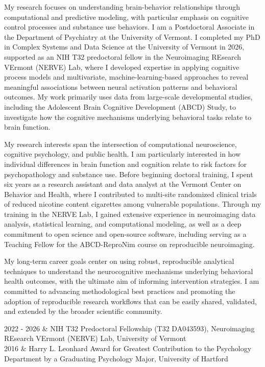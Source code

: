 \documentclass{nihbiosketch}
\begin{document}

My research focuses on understanding brain-behavior relationships through computational and predictive modeling, with particular emphasis on cognitive control processes and substance use behaviors. I am a Postdoctoral Associate in the Department of Psychiatry at the University of Vermont. I completed my PhD in Complex Systems and Data Science at the University of Vermont in 2026, supported as an NIH T32 predoctoral fellow in the Neuroimaging REsearch VErmont (NERVE) Lab, where I developed expertise in applying cognitive process models and multivariate, machine-learning-based approaches to reveal meaningful associations between neural activation patterns and behavioral outcomes. My work primarily uses data from large-scale developmental studies, including the Adolescent Brain Cognitive Development (ABCD) Study, to investigate how the cognitive mechanisms underlying behavioral tasks relate to brain function.

My research interests span the intersection of computational neuroscience, cognitive psychology, and public health. I am particularly interested in how individual differences in brain function and cognition relate to risk factors for psychopathology and substance use. Before beginning doctoral training, I spent six years as a research assistant and data analyst at the Vermont Center on Behavior and Health, where I contributed to multi-site randomized clinical trials of reduced nicotine content cigarettes among vulnerable populations. Through my training in the NERVE Lab, I gained extensive experience in neuroimaging data analysis, statistical learning, and computational modeling, as well as a deep commitment to open science and open-source software, including serving as a Teaching Fellow for the ABCD-ReproNim course on reproducible neuroimaging.

My long-term career goals center on using robust, reproducible analytical techniques to understand the neurocognitive mechanisms underlying behavioral health outcomes, with the ultimate aim of informing intervention strategies. I am committed to advancing methodological best practices and promoting the adoption of reproducible research workflows that can be easily shared, validated, and extended by the broader scientific community.

\begin{datelist}
	2022 - 2026 & NIH T32 Predoctoral Fellowship (T32 DA043593), Neuroimaging REsearch VErmont (NERVE) Lab, University of Vermont \\
	2016 & Harry L. Leonhard Award for Greatest Contribution to the Psychology Department by a Graduating Psychology Major, University of Hartford \\
\end{datelist}
\end{document}
